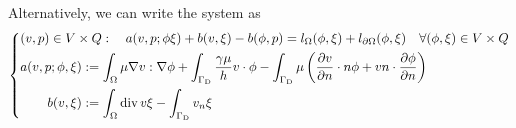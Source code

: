 Alternatively, we can write the system as
%
\begin{equation}\label{eq:stokes:weakform2}
%
\left\{
\begin{aligned}
&(v,p)\in V\times Q:\quad a(v,p; \phi\xi) + b(v, \xi)- b(\phi, p) = l_{\Omega}(\phi,\xi)+l_{\partial\Omega}(\phi,\xi) \quad\forall (\phi,\xi)\in V\times Q\\
&\begin{aligned}
a(v,p; \phi,\xi) &:= \int_{\Omega} \mu \nabla v:\nabla\phi +\int_{\GammaD}\frac{\gamma\mu}{h}v\cdot\phi - 
 \int_{\GammaD}\mu \left(  \dn{v}\cdot n \phi + v n \cdot \dn{\phi}\right)\\
b(v, \xi) &:=  \int_{\Omega} \div v \xi - \int_{\GammaD} v_n \xi
\end{aligned}
\end{aligned}
\right.
%
\end{equation}
%



%
